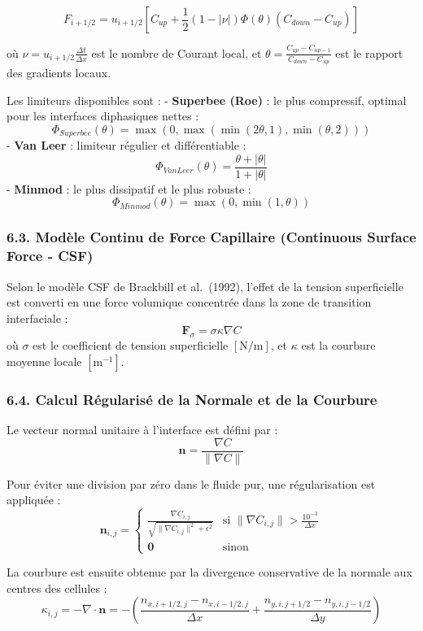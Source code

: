 \documentclass[
  french,
]{article}
\begin{document}
\[F_{i+1/2} = u_{i+1/2} \left[ C_{up} + \frac{1}{2} (1 - |\nu|) \Phi(\theta) (C_{down} - C_{up}) \right]\]

où \(\nu = u_{i+1/2} \frac{\Delta t}{\Delta x}\) est le nombre de
Courant local, et
\(\theta = \frac{C_{up} - C_{up-1}}{C_{down} - C_{up}}\) est le rapport
des gradients locaux.

Les limiteurs disponibles sont : - \textbf{Superbee (Roe)} : le plus
compressif, optimal pour les interfaces diphasiques nettes :
\[\Phi_{Superbee}(\theta) = \max \left( 0, \max(\min(2\theta, 1), \min(\theta, 2)) \right)\]
- \textbf{Van Leer} : limiteur régulier et différentiable :
\[\Phi_{VanLeer}(\theta) = \frac{\theta + |\theta|}{1 + |\theta|}\] -
\textbf{Minmod} : le plus dissipatif et le plus robuste :
\[\Phi_{Minmod}(\theta) = \max(0, \min(1, \theta))\]

\subsubsection{6.3. Modèle Continu de Force Capillaire (Continuous
Surface Force -
CSF)}\label{moduxe8le-continu-de-force-capillaire-continuous-surface-force---csf}

Selon le modèle CSF de Brackbill et al.~(1992), l'effet de la tension
superficielle est converti en une force volumique concentrée dans la
zone de transition interfaciale :
\[\mathbf{F}_\sigma = \sigma \kappa \nabla C\] où \(\sigma\) est le
coefficient de tension superficielle \([\text{N/m}]\), et \(\kappa\) est
la courbure moyenne locale \([\text{m}^{-1}]\).

\subsubsection{6.4. Calcul Régularisé de la Normale et de la
Courbure}\label{calcul-ruxe9gularisuxe9-de-la-normale-et-de-la-courbure}

Le vecteur normal unitaire à l'interface est défini par :
\[\mathbf{n} = \frac{\nabla C}{\|\nabla C\|}\]

Pour éviter une division par zéro dans le fluide pur, une régularisation
est appliquée :
\[\mathbf{n}_{i, j} = \begin{cases} \frac{\nabla C_{i, j}}{\sqrt{\|\nabla C_{i, j}\|^2 + \epsilon^2}} & \text{si } \|\nabla C_{i, j}\| > \frac{10^{-3}}{\Delta x} \\ \mathbf{0} & \text{sinon} \end{cases}\]

La courbure est ensuite obtenue par la divergence conservative de la
normale aux centres des cellules :
\[\kappa_{i, j} = - \nabla \cdot \mathbf{n} = - \left( \frac{n_{x, i+1/2, j} - n_{x, i-1/2, j}}{\Delta x} + \frac{n_{y, i, j+1/2} - n_{y, i, j-1/2}}{\Delta y} \right)\]
\end{document}
